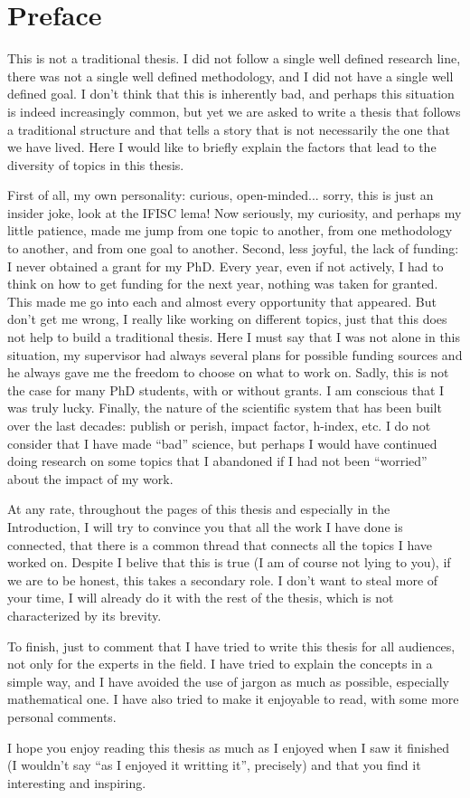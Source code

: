 \pagebreak
\thispagestyle{empty}
\section*{Preface}

This is not a traditional thesis. I did not follow a single well defined
research line, there was not a single well defined methodology, and I did not
have a single well defined goal. I don't think that this is inherently bad, and
perhaps this situation is indeed increasingly common, but yet we are asked to
write a thesis that follows a traditional structure and that tells a story that
is not necessarily the one that we have lived. Here I would like to briefly
explain the factors that lead to the diversity of topics in this thesis.

First of all, my own personality: curious, open-minded... sorry, this is just
an insider joke, look at the IFISC lema! Now seriously, my curiosity, and
perhaps my little patience, made me jump from one topic to another, from one
methodology to another, and from one goal to another. Second, less joyful,
the lack of funding: I never obtained a grant for my PhD. Every year, even if
not actively, I had to think on how to get funding for the next year, nothing
was taken for granted. This made me go into each and almost every opportunity
that appeared. But don't get me wrong, I really like working on different
topics, just that this does not help to build a traditional thesis. Here I must
say that I was not alone in this situation, my supervisor had always several
plans for possible funding sources and he always gave me the freedom to choose
on what to work on. Sadly, this is not the case for many PhD students, with or
without grants. I am conscious that I was truly lucky. Finally, the nature of
the scientific system that has been built over the last decades:
publish or perish, impact factor, h-index, etc. I do not consider that I
have made ``bad'' science, but perhaps I would have continued doing research on
some topics that I abandoned if I had not been ``worried'' about the impact of
my work.

At any rate, throughout the pages of this thesis and especially in the
Introduction, I will try to convince you that all the work I have done is
connected, that there is a common thread that connects all the topics I have
worked on. Despite I belive that this is true (I am of course not lying to
you), if we are to be honest, this takes a secondary role. I don't want to
steal more of your time, I will already do it with the rest of the thesis,
which is not characterized by its brevity.

To finish, just to comment that I have tried to write this thesis for all
audiences, not only for the experts in the field. I have tried to explain the
concepts in a simple way, and I have avoided the use of jargon as much as
possible, especially mathematical one. I have also tried to make it enjoyable
to read, with some more personal comments.

I hope you enjoy reading this thesis as much as I enjoyed when I saw it
finished (I wouldn't say ``as I enjoyed it writting it'', precisely) and that
you find it interesting and inspiring.

\vfill